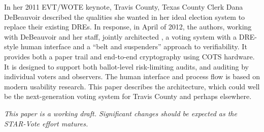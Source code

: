 In her 2011 EVT/WOTE keynote, Travis County, Texas County Clerk
Dana DeBeauvoir described the qualities she wanted in her ideal election system
to replace their existing DREs.
In response, in April of 2012, the authors, working with DeBeauvoir and her staff,
jointly architected \projname, a voting system with a DRE-style human interface
and a ``belt and suspenders'' approach to verifiability.
It provides both a paper trail and end-to-end cryptography using COTS hardware.
It is designed to support both ballot-level risk-limiting audits,
and auditing by individual voters and observers.
The human interface and process flow is based on modern usability research.
This paper describes the \projname architecture, which could well be
the next-generation voting system for Travis County and perhaps
elsewhere.

{\em This paper is a working draft. Significant changes should be
  expected as the STAR-Vote effort matures.}
